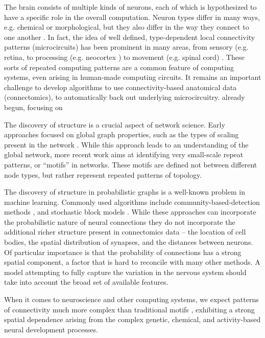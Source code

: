 \documentclass{article}
\begin{document}
The brain consists of multiple kinds of neurons, each of which is
hypothesized to have a specific role in the overall
computation. Neuron types differ in many ways, e.g. chemical or
morphological, but they also differ in the way they connect to one
another \autocite{Seung2014}. In fact, the idea of well defined,
type-dependent local connectivity patterns (microcircuits) has been
prominent in many areas, from sensory (e.g. retina,
\autocite{Masland2001} to processing (e.g. neocortex
\autocite{Mountcastle1997}) to movement (e.g. spinal cord)
\autocite{Grillner2005}. These sorts of repeated computing patterns
are a common feature of computing systems, even arising in human-made
computing circuits. It remains an important challenge to develop
algorithms to use connectivity-based anatomical data (connectomics), to
automatically back out underlying microcircuitry.  already begun,
focusing on

The discovery of structure is a crucial aspect of network
science. Early approaches focused on global graph properties, such as
the types of scaling present in the network \autocite
{WattsStrogatz1998}.  While this approach leads to an understanding
of the global network, more recent work aims at identifying very small-scale
repeat patterns, or “motifs” in networks\autocite{Milo2002}. These motifs
are defined not between different node types, but rather represent repeated
patterns of topology. 

The discovery of structure in probabilistic graphs is a well-known
problem in machine learning. Commonly used algorithms include
community-based-detection methods \autocite{Girvan2002}, and
stochastic block models \autocite{Nowicki2001}.  While these
approaches can incorporate the probabilistic nature of neural
connections \autocite{Hill2012} they do not incorporate the additional
richer structure present in connectomics data -- the location of cell
bodies, the spatial distribution of synapses, and the distances
between neurons. Of particular importance is that the probability of
connections has a strong spatial component, a factor that is hard to
reconcile with many other methods. A model attempting to fully capture
the variation in the nervous system should take into account the broad
set of available features.

When it comes to neuroscience and other computing systems, we expect
patterns of connectivity much more complex than traditional motifs
, exhibiting a
strong spatial dependence arising from the complex genetic, chemical,
and activity-based neural development processes.
\end{document}
